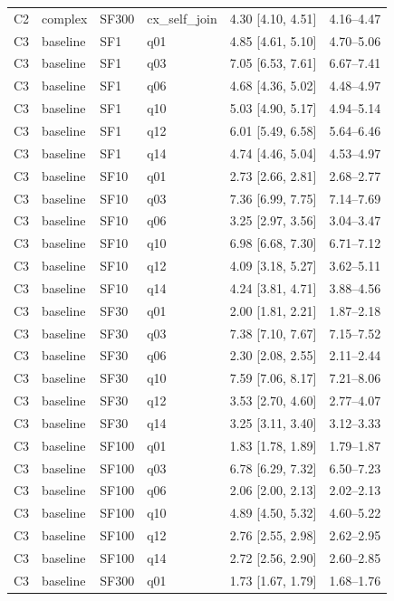 \begin{longtable}{lllllr}
C2 & complex & SF300 & cx\_self\_join & 4.30 [4.10, 4.51] & 4.16--4.47 \\
C3 & baseline & SF1 & q01 & 4.85 [4.61, 5.10] & 4.70--5.06 \\
C3 & baseline & SF1 & q03 & 7.05 [6.53, 7.61] & 6.67--7.41 \\
C3 & baseline & SF1 & q06 & 4.68 [4.36, 5.02] & 4.48--4.97 \\
C3 & baseline & SF1 & q10 & 5.03 [4.90, 5.17] & 4.94--5.14 \\
C3 & baseline & SF1 & q12 & 6.01 [5.49, 6.58] & 5.64--6.46 \\
C3 & baseline & SF1 & q14 & 4.74 [4.46, 5.04] & 4.53--4.97 \\
C3 & baseline & SF10 & q01 & 2.73 [2.66, 2.81] & 2.68--2.77 \\
C3 & baseline & SF10 & q03 & 7.36 [6.99, 7.75] & 7.14--7.69 \\
C3 & baseline & SF10 & q06 & 3.25 [2.97, 3.56] & 3.04--3.47 \\
C3 & baseline & SF10 & q10 & 6.98 [6.68, 7.30] & 6.71--7.12 \\
C3 & baseline & SF10 & q12 & 4.09 [3.18, 5.27] & 3.62--5.11 \\
C3 & baseline & SF10 & q14 & 4.24 [3.81, 4.71] & 3.88--4.56 \\
C3 & baseline & SF30 & q01 & 2.00 [1.81, 2.21] & 1.87--2.18 \\
C3 & baseline & SF30 & q03 & 7.38 [7.10, 7.67] & 7.15--7.52 \\
C3 & baseline & SF30 & q06 & 2.30 [2.08, 2.55] & 2.11--2.44 \\
C3 & baseline & SF30 & q10 & 7.59 [7.06, 8.17] & 7.21--8.06 \\
C3 & baseline & SF30 & q12 & 3.53 [2.70, 4.60] & 2.77--4.07 \\
C3 & baseline & SF30 & q14 & 3.25 [3.11, 3.40] & 3.12--3.33 \\
C3 & baseline & SF100 & q01 & 1.83 [1.78, 1.89] & 1.79--1.87 \\
C3 & baseline & SF100 & q03 & 6.78 [6.29, 7.32] & 6.50--7.23 \\
C3 & baseline & SF100 & q06 & 2.06 [2.00, 2.13] & 2.02--2.13 \\
C3 & baseline & SF100 & q10 & 4.89 [4.50, 5.32] & 4.60--5.22 \\
C3 & baseline & SF100 & q12 & 2.76 [2.55, 2.98] & 2.62--2.95 \\
C3 & baseline & SF100 & q14 & 2.72 [2.56, 2.90] & 2.60--2.85 \\
C3 & baseline & SF300 & q01 & 1.73 [1.67, 1.79] & 1.68--1.76 \\

\end{longtable}
